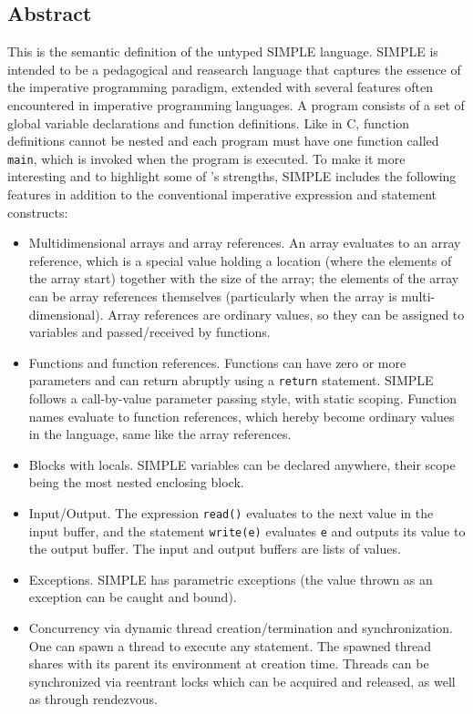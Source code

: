 \begin{kblock}[text]
\section{Abstract}
This is the \K semantic definition of the untyped SIMPLE language.
SIMPLE is intended to be a pedagogical and reasearch language that captures
the essence of the imperative programming paradigm, extended with several
features often encountered in imperative programming languages.
A program consists of a set of global variable declarations and
function definitions.  Like in C, function definitions cannot be
nested and each program must have one function called \texttt{main},
which is invoked when the program is executed.  To make it more
interesting and to highlight some of \K's strengths, SIMPLE includes
the following features in addition to the conventional imperative
expression and statement constructs:
\begin{itemize}
\item Multidimensional arrays and array references.  An array evaluates
to an array reference, which is a special value holding a location (where
the elements of the array start) together with the size of the array;
the elements of the array can be array references themselves (particularly
when the array is multi-dimensional).  Array references are ordinary values,
so they can be assigned to variables and passed/received by functions.
\item Functions and function references.  Functions can have zero or
more parameters and can return abruptly using a \texttt{return} statement.
SIMPLE follows a call-by-value parameter passing style, with static scoping.
Function names evaluate to function references, which hereby become ordinary
values in the language, same like the array references.
\item Blocks with locals.  SIMPLE variables can be declared
anywhere, their scope being the most nested enclosing block.
\item Input/Output.  The expression \texttt{read()} evaluates to the
next value in the input buffer, and the statement \texttt{write(e)}
evaluates \texttt{e} and outputs its value to the output buffer.  The
input and output buffers are lists of values.
\item Exceptions.  SIMPLE has parametric exceptions (the value thrown as
an exception can be caught and bound).
\item Concurrency via dynamic thread creation/termination and
synchronization.  One can spawn a thread to execute any statement.
The spawned thread shares with its parent its environment at creation time.
Threads can be synchronized via reentrant locks which can be acquired and
released, as well as through rendezvous.


\end{itemize}
\end{kblock}
